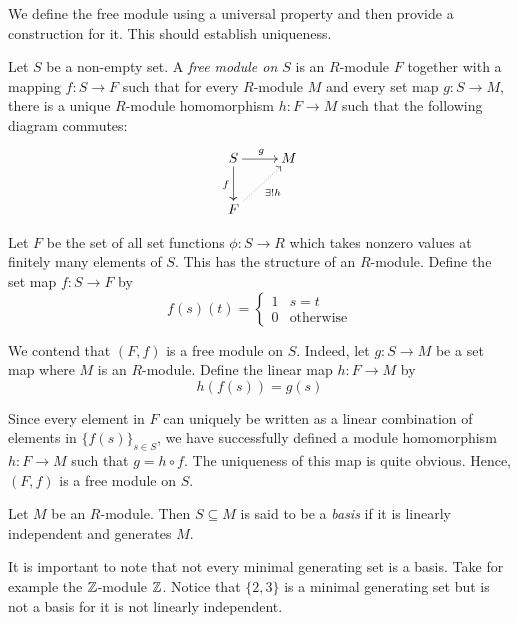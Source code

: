 We define the free module using a universal property and then provide a construction for it. This should establish uniqueness.

\begin{definition}
    Let $S$ be a non-empty set. A \textit{free module on $S$} is an $R$-module $F$ together with a mapping $f: S\to F$ such that for every $R$-module $M$ and every set map $g: S\to M$, there is a unique $R$-module homomorphism $h: F\to M$ such that the following diagram commutes: 
    \begin{equation*}
    \xymatrix{
        S\ar[r]^g\ar[d]_f & M\\
        F\ar@{.>}[ru]_{\exists! h}
    }
    \end{equation*}
\end{definition}

Let $F$ be the set of all set functions $\phi: S\to R$ which takes nonzero values at finitely many elements of $S$. This has the structure of an $R$-module. Define the set map $f: S\to F$ by 
\begin{equation*}
    f(s)(t) = 
    \begin{cases}
        1 & s = t\\
        0 & \text{otherwise}
    \end{cases}
\end{equation*}

We contend that $(F,f)$ is a free module on $S$. Indeed, let $g: S\to M$ be a set map where $M$ is an $R$-module. Define the linear map $h: F\to M$ by 
\begin{equation*}
    h(f(s)) = g(s)
\end{equation*}

Since every element in $F$ can uniquely be written as a linear combination of elements in $\{f(s)\}_{s\in S}$, we have successfully defined a module homomorphism $h: F\to M$ such that $g = h\circ f$. The uniqueness of this map is quite obvious. Hence, $(F,f)$ is a free module on $S$.

\begin{definition}[Basis]
    Let $M$ be an $R$-module. Then $S\subseteq M$ is said to be a \textit{basis} if it is linearly independent and generates $M$.
\end{definition}

It is important to note that not every minimal generating set is a basis. Take for example the $\mathbb{Z}$-module $\mathbb{Z}$. Notice that $\{2,3\}$ is a minimal generating set but is not a basis for it is not linearly independent.

